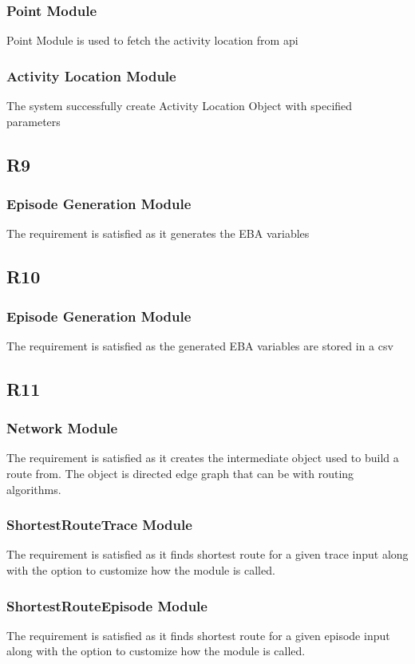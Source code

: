 \documentclass[12pt, titlepage]{article}
\begin{document}
\subsubsection{Point Module}
Point Module is used to fetch the activity location from api

\subsubsection{Activity Location Module}
The system successfully create Activity Location Object with specified parameters

\subsection{R9}
\subsubsection{Episode Generation Module}
The requirement is satisfied as it generates the EBA variables 
\subsection{R10}
\subsubsection{Episode Generation Module}
The requirement is satisfied as the generated EBA variables are stored in a csv
\subsection{R11}
\subsubsection{Network Module}
The requirement is satisfied as it creates the intermediate object used to build a route from. The object is directed edge graph that can be with routing algorithms.
\subsubsection{ShortestRouteTrace Module}
The requirement is satisfied as it finds shortest route for a given trace input along with the option to customize how the module is called.
\subsubsection{ShortestRouteEpisode Module}
The requirement is satisfied as it finds shortest route for a given episode input along with the option to customize how the module is called. 
\end{document}
